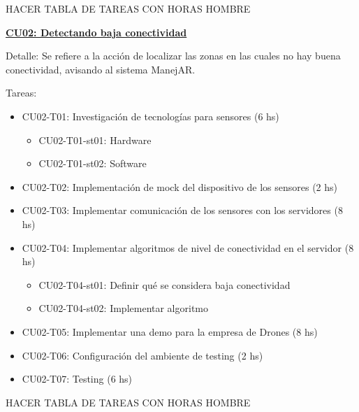 HACER TABLA DE TAREAS CON HORAS HOMBRE

\textbf{\underline{CU02: Detectando baja conectividad}}\newline

Detalle: Se refiere a la acción de localizar las zonas en las cuales no hay buena 
conectividad, avisando al sistema ManejAR.




Tareas: 
\begin{itemize}

\item CU02-T01: Investigación de tecnologías para sensores (6 hs)
\begin{itemize}
\item CU02-T01-st01: Hardware
\item CU02-T01-st02: Software
\end{itemize}

\item CU02-T02: Implementación de mock del dispositivo de los sensores (2 hs)
\item CU02-T03: Implementar comunicación de los sensores con los servidores (8 hs)

\item CU02-T04: Implementar algoritmos de nivel de conectividad en el servidor (8 hs)
\begin{itemize}
\item CU02-T04-st01: Definir qué se considera baja conectividad
\item CU02-T04-st02: Implementar algoritmo
\end{itemize}

\item CU02-T05: Implementar una demo para la empresa de Drones (8 hs)
\item CU02-T06: Configuración del ambiente de testing (2 hs)
\item CU02-T07: Testing (6 hs)

\end{itemize}

HACER TABLA DE TAREAS CON HORAS HOMBRE